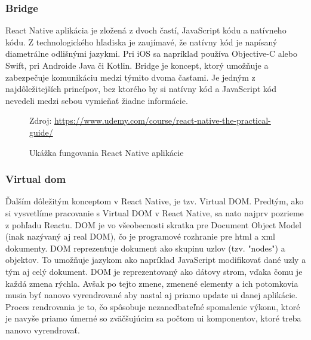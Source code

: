 \subsubsection{Bridge}
React Native aplikácia je zložená z dvoch častí, JavaScript kódu a natívneho kódu. Z technologického hľadiska je zaujímavé, že natívny kód je napísaný diametrálne odlišnými jazykmi. Pri iOS sa napríklad používa Objective-C alebo Swift, pri Androide Java či Kotlin. Bridge je koncept, ktorý umožňuje a zabezpečuje komunikáciu medzi týmito dvoma časťami. Je jedným z najdôležitejších princípov, bez ktorého by si natívny kód a JavaScript kód nevedeli medzi sebou vymieňať žiadne informácie. 
\begin{figure}[!htbp]
  \centering  
  \def\stackalignment{c}
           {\scriptsize%
            Zdroj: \url{https://www.udemy.com/course/react-native-the-practical-guide/}}
	\caption{Ukážka fungovania React Native aplikácie}  
  \label{reactAppExplained}
\end{figure}
\subsubsection{Virtual \acrfull{dom}}
Ďalším dôležitým konceptom v React Native, je tzv. Virtual DOM. Predtým, ako si vysvetlíme pracovanie s Virtual DOM v React Native, sa nato najprv pozrieme z pohľadu Reactu. DOM je vo všeobecnosti skratka pre Document Object Model (inak nazývaný aj real DOM), čo je programové rozhranie pre \acrshort{html} a \acrshort{xml} dokumenty. DOM reprezentuje dokument ako skupinu uzlov (tzv. "nodes") a objektov. To umožňuje jazykom ako napríklad JavaScript modifikovať dané uzly a tým aj celý dokument. DOM je reprezentovaný ako dátovy strom, vďaka čomu je každá zmena rýchla. Avšak po tejto zmene, zmenené elementy a ich potomkovia musia byť nanovo vyrendrované aby nastal aj priamo update \acrshort{ui} danej aplikácie. Proces rendrovania je to, čo spôsobuje nezanedbateľné spomalenie výkonu, ktoré je navyše priamo úmerné so zväčšujúcim sa počtom \acrshort{ui} komponentov, ktoré treba nanovo vyrendrovať.

